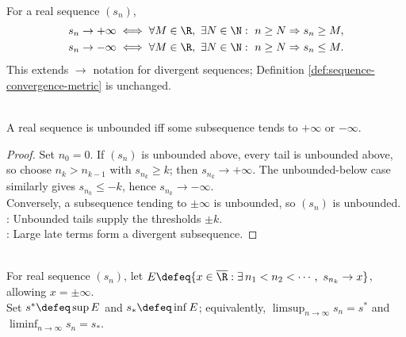 \begin{definition} \label{def:sequence-diverges-to-infinity} \\
For a real sequence $(s_n)$,
\begin{align}
s_n\to+\infty &\iff \forall M\in\R,\ \exists N\in\N:\ n\geq N\Rightarrow s_n\geq M, \nonumber\\
s_n\to-\infty &\iff \forall M\in\R,\ \exists N\in\N:\ n\geq N\Rightarrow s_n\leq M. \nonumber
\end{align}
This extends $\to$ notation for divergent sequences; Definition \ref{def:sequence-convergence-metric} is unchanged.
\end{definition}

\begin{proposition} \label{prop:unbounded-real-sequence-has-infinite-subsequence} \\
A real sequence is unbounded iff some subsequence tends to $+\infty$ or $-\infty$.
\begin{proof}
Set $n_0=0$. If $(s_n)$ is unbounded above, every tail is unbounded above, so choose $n_k>n_{k-1}$ with $s_{n_k}\geq k$; then $s_{n_k}\to+\infty$. The unbounded-below case similarly gives $s_{n_k}\leq-k$, hence $s_{n_k}\to-\infty$.\\
Conversely, a subsequence tending to $\pm\infty$ is unbounded, so $(s_n)$ is unbounded.\\
: Unbounded tails supply the thresholds $\pm k$.\\
: Large late terms form a divergent subsequence.
\end{proof}
\end{proposition}

\begin{definition} \label{def:upper-and-lower-limits} \\
For real sequence $(s_n)$, let $E\defeq\{x\in\overline{\R}:\exists\, n_1<n_2<\cdots,\ s_{n_k}\to x\}$, allowing $x=\pm\infty$.\\
Set $s^*\defeq\sup E$ and $s_*\defeq\inf E$; equivalently, $\limsup_{n\to\infty}s_n=s^*$ and $\liminf_{n\to\infty}s_n=s_*$.
\end{definition}

